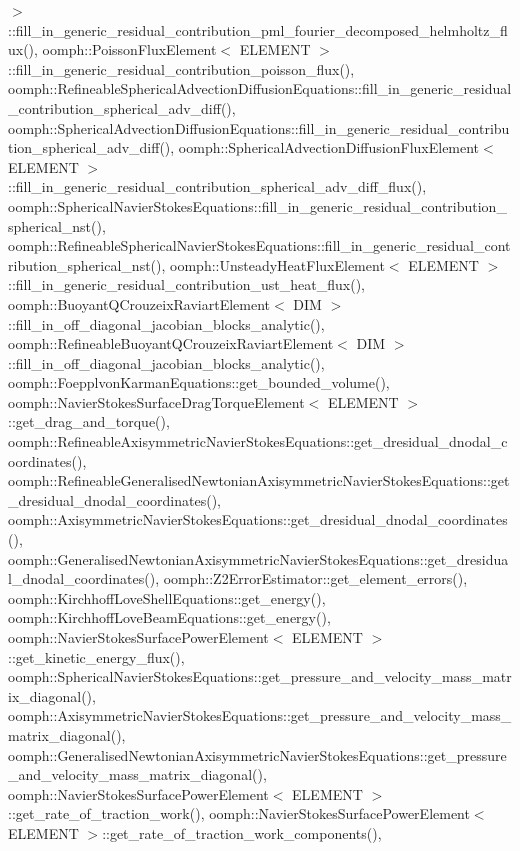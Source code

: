 $>$\+::fill\+\_\+in\+\_\+generic\+\_\+residual\+\_\+contribution\+\_\+pml\+\_\+fourier\+\_\+decomposed\+\_\+helmholtz\+\_\+flux(), oomph\+::\+Poisson\+Flux\+Element$<$ E\+L\+E\+M\+E\+N\+T $>$\+::fill\+\_\+in\+\_\+generic\+\_\+residual\+\_\+contribution\+\_\+poisson\+\_\+flux(), oomph\+::\+Refineable\+Spherical\+Advection\+Diffusion\+Equations\+::fill\+\_\+in\+\_\+generic\+\_\+residual\+\_\+contribution\+\_\+spherical\+\_\+adv\+\_\+diff(), oomph\+::\+Spherical\+Advection\+Diffusion\+Equations\+::fill\+\_\+in\+\_\+generic\+\_\+residual\+\_\+contribution\+\_\+spherical\+\_\+adv\+\_\+diff(), oomph\+::\+Spherical\+Advection\+Diffusion\+Flux\+Element$<$ E\+L\+E\+M\+E\+N\+T $>$\+::fill\+\_\+in\+\_\+generic\+\_\+residual\+\_\+contribution\+\_\+spherical\+\_\+adv\+\_\+diff\+\_\+flux(), oomph\+::\+Spherical\+Navier\+Stokes\+Equations\+::fill\+\_\+in\+\_\+generic\+\_\+residual\+\_\+contribution\+\_\+spherical\+\_\+nst(), oomph\+::\+Refineable\+Spherical\+Navier\+Stokes\+Equations\+::fill\+\_\+in\+\_\+generic\+\_\+residual\+\_\+contribution\+\_\+spherical\+\_\+nst(), oomph\+::\+Unsteady\+Heat\+Flux\+Element$<$ E\+L\+E\+M\+E\+N\+T $>$\+::fill\+\_\+in\+\_\+generic\+\_\+residual\+\_\+contribution\+\_\+ust\+\_\+heat\+\_\+flux(), oomph\+::\+Buoyant\+Q\+Crouzeix\+Raviart\+Element$<$ D\+I\+M $>$\+::fill\+\_\+in\+\_\+off\+\_\+diagonal\+\_\+jacobian\+\_\+blocks\+\_\+analytic(), oomph\+::\+Refineable\+Buoyant\+Q\+Crouzeix\+Raviart\+Element$<$ D\+I\+M $>$\+::fill\+\_\+in\+\_\+off\+\_\+diagonal\+\_\+jacobian\+\_\+blocks\+\_\+analytic(), oomph\+::\+Foepplvon\+Karman\+Equations\+::get\+\_\+bounded\+\_\+volume(), oomph\+::\+Navier\+Stokes\+Surface\+Drag\+Torque\+Element$<$ E\+L\+E\+M\+E\+N\+T $>$\+::get\+\_\+drag\+\_\+and\+\_\+torque(), oomph\+::\+Refineable\+Axisymmetric\+Navier\+Stokes\+Equations\+::get\+\_\+dresidual\+\_\+dnodal\+\_\+coordinates(), oomph\+::\+Refineable\+Generalised\+Newtonian\+Axisymmetric\+Navier\+Stokes\+Equations\+::get\+\_\+dresidual\+\_\+dnodal\+\_\+coordinates(), oomph\+::\+Axisymmetric\+Navier\+Stokes\+Equations\+::get\+\_\+dresidual\+\_\+dnodal\+\_\+coordinates(), oomph\+::\+Generalised\+Newtonian\+Axisymmetric\+Navier\+Stokes\+Equations\+::get\+\_\+dresidual\+\_\+dnodal\+\_\+coordinates(), oomph\+::\+Z2\+Error\+Estimator\+::get\+\_\+element\+\_\+errors(), oomph\+::\+Kirchhoff\+Love\+Shell\+Equations\+::get\+\_\+energy(), oomph\+::\+Kirchhoff\+Love\+Beam\+Equations\+::get\+\_\+energy(), oomph\+::\+Navier\+Stokes\+Surface\+Power\+Element$<$ E\+L\+E\+M\+E\+N\+T $>$\+::get\+\_\+kinetic\+\_\+energy\+\_\+flux(), oomph\+::\+Spherical\+Navier\+Stokes\+Equations\+::get\+\_\+pressure\+\_\+and\+\_\+velocity\+\_\+mass\+\_\+matrix\+\_\+diagonal(), oomph\+::\+Axisymmetric\+Navier\+Stokes\+Equations\+::get\+\_\+pressure\+\_\+and\+\_\+velocity\+\_\+mass\+\_\+matrix\+\_\+diagonal(), oomph\+::\+Generalised\+Newtonian\+Axisymmetric\+Navier\+Stokes\+Equations\+::get\+\_\+pressure\+\_\+and\+\_\+velocity\+\_\+mass\+\_\+matrix\+\_\+diagonal(), oomph\+::\+Navier\+Stokes\+Surface\+Power\+Element$<$ E\+L\+E\+M\+E\+N\+T $>$\+::get\+\_\+rate\+\_\+of\+\_\+traction\+\_\+work(), oomph\+::\+Navier\+Stokes\+Surface\+Power\+Element$<$ E\+L\+E\+M\+E\+N\+T $>$\+::get\+\_\+rate\+\_\+of\+\_\+traction\+\_\+work\+\_\+components(), 